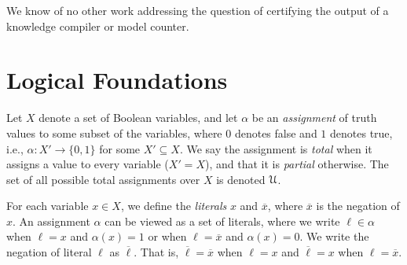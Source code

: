 \documentclass[letterpaper,USenglish,cleveref, autoref, thm-restate]{lipics-v2021}
\newcommand{\obar}[1]{\overline{#1}}
\newcommand{\lit}{\ell}
\newcommand{\varset}{X}
\newcommand{\assign}{\alpha}
\newcommand{\uassign}{{\cal U}}
\begin{document}
We know of no other
work addressing the question of certifying the output of a knowledge
compiler or model counter.

\section{Logical Foundations}
\label{section:logical:foundations}

  Let $\varset$ denote a set of Boolean variables, and let $\assign$
  be an {\em assignment} of truth values to some subset of the
  variables, where $0$ denotes false and $1$ denotes true, i.e.,
  $\assign \colon \varset' \rightarrow \{0,1\}$ for some $\varset'
  \subseteq \varset$.  We say the assignment is {\em total} when it
  assigns a value to every variable ($\varset' = \varset$), and that
  it is {\em partial} otherwise.
  The set of all possible total assignments over
  $\varset$ is denoted $\uassign$.

For each variable $x \in \varset$,
  we define the {\em literals} $x$ and $\obar{x}$, where $\obar{x}$ is the
  negation of $x$. An
  assignment $\assign$ can be viewed as a set of literals, where
  we write $\lit \in \assign$ when $\lit = x$ and $\assign(x) = 1$ or when
  $\lit = \obar{x}$ and $\assign(x) = 0$.  We write the negation of literal $\lit$ as $\obar{\lit}$.  That is, $\obar{\lit} = \obar{x}$ when $\lit = x$ and
$\obar{\lit} = x$ when $\lit = \obar{x}$.
\end{document}
